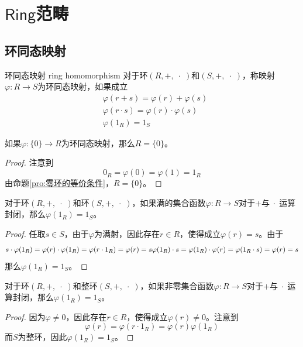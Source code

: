 \section{$\mathsf{Ring}$范畴}

\subsection{环同态映射}

\begin{definition}{环同态映射 ring homomorphism}
	对于环$(R,+,\;\cdot\;)$和$(S,+,\;\cdot\;)$，称映射$\varphi:R\to S$为环同态映射，如果成立
	\begin{align*}
		&\varphi(r+s)=\varphi(r)+\varphi(s)\\
		&\varphi(r\cdot s)=\varphi(r)\cdot\varphi(s)\\
		&\varphi(1_R)=1_S
	\end{align*}
\end{definition}

\begin{proposition}
	如果$\varphi:\{0\}\to R$为环同态映射，那么$R=\{0\}$。
\end{proposition}

\begin{proof}
	注意到
	$$
	0_R=\varphi(0)=\varphi(1)=1_R
	$$
	由命题\ref{pro:零环的等价条件}，$R=\{0\}$。
\end{proof}

\begin{proposition}
	对于环$(R,+,\;\cdot\;)$和环$(S,+,\;\cdot\;)$，如果满的集合函数$\varphi:R\to S$对于$+$与$\;\cdot\;$运算封闭，那么$\varphi(1_R)=1_S$。
\end{proposition}

\begin{proof}
	任取$s\in S$，由于$\varphi$为满射，因此存在$r\in R$，使得成立$\varphi(r)=s$。由于
	$$
	s\cdot\varphi(1_R)=\varphi(r)\cdot\varphi(1_R)=\varphi(r\cdot1_R)=\varphi(r)=s\\
	\varphi(1_R)\cdot s=\varphi(1_R)\cdot\varphi(r)=\varphi(1_R\cdot s)=\varphi(r)=s
	$$
	那么$\varphi(1_R)=1_S$。
\end{proof}

\begin{proposition}
	对于环$(R,+,\;\cdot\;)$和整环$(S,+,\;\cdot\;)$，如果非零集合函数$\varphi:R\to S$对于$+$与$\;\cdot\;$运算封闭，那么$\varphi(1_R)=1_S$。
\end{proposition}

\begin{proof}
	因为$\varphi\ne0$，因此存在$r\in R$，使得成立$\varphi(r)\ne0$。注意到
	$$
	\varphi(r)=\varphi(r\cdot 1_R)=\varphi(r)\varphi(1_R)
	$$
	而$S$为整环，因此$\varphi(1_R)=1_S$。
\end{proof}

